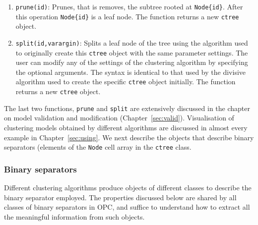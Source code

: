 \documentclass{book}
\begin{document}
\begin{enumerate}
\item {\tt prune(id)}: Prunes, that is removes, the subtree rooted at {\tt Node\{id\}}. 
After this operation {\tt Node\{id\}} is a leaf node. The function returns a new {\tt ctree} object.

\item {\tt split(id,varargin)}: Splits a leaf node of the tree using the algorithm
used to originally create this {\tt ctree} object with the same parameter settings.
The user can modify any of the settings of the clustering algorithm by specifying
the optional arguments. The syntax is identical to that used by the divisive algorithm
used to create the specific {\tt ctree} object initially. The function returns a new {\tt ctree} object.

\end{enumerate}

\noindent
%
The last two functions, {\tt prune} and {\tt split} are extensively discussed
in the chapter on model validation and modification (Chapter~\ref{sec:valid}).
%
Visualisation of clustering models obtained by different algorithms are
discussed in almost every example in Chapter~\ref{sec:using}.
%
We next describe the objects that describe binary separators (elements
of the {\tt Node} cell array in the {\tt ctree} class.

\subsubsection*{Binary separators}

Different clustering algorithms produce objects of different classes
to describe the binary separator employed.
%
The properties discussed below are shared by all classes of binary separators
in OPC, and suffice to understand how to extract all the meaningful information
from such objects.
\end{document}
